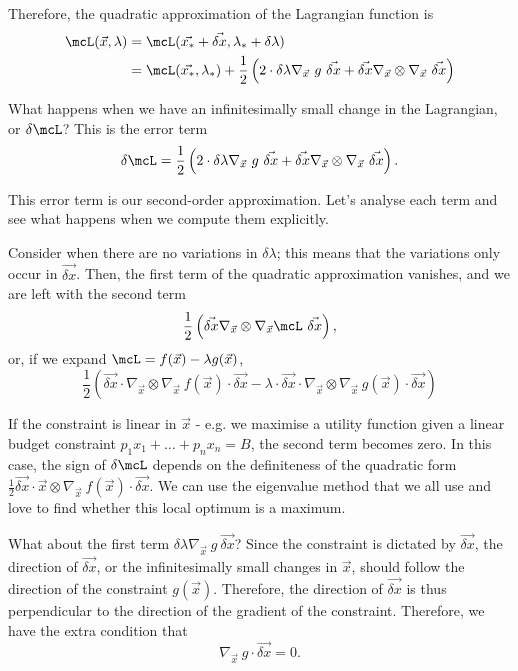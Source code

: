 \documentclass[a4paper, 12pt,oneside,openany]{book}
\begin{document}
Therefore, the quadratic approximation of the Lagrangian function is \begin{align*} \mcL(\vec{x}, \lambda) &= \mcL(\vec{x_*} + \vec{\delta x}, \lambda_* + \delta\lambda) \\ &= \mcL(\vec{x_*}, \lambda_*) + \frac{1}{2} \left(2\cdot  \delta \lambda \nabla_{\vec{x}}\ g\ \vec{\delta x} +\vec{\delta x} \nabla_{\vec{x}} \otimes \nabla_{\vec{x}}\ \vec{\delta x} \right) \end{align*}

What happens when we have an infinitesimally small change in the Lagrangian, or $\delta \mcL$? This is the error term $$\delta \mcL = \frac{1}{2} \left(2\cdot  \delta \lambda \nabla_{\vec{x}}\ g\ \vec{\delta x} +\vec{\delta x} \nabla_{\vec{x}} \otimes \nabla_{\vec{x}}\ \vec{\delta x} \right).$$

This error term is our second-order approximation. Let's analyse each term and see what happens when we compute them explicitly. 

Consider when there are no variations in $\delta\lambda$; this means that the variations only occur in $\vec{\delta x}$. Then, the first term of the quadratic approximation vanishes, and we are left with the second term $$\frac{1}{2} \left( \vec{\delta x} \nabla_{\vec{x}} \otimes \nabla_{\vec{x}}\mcL \ \vec{\delta x} \right),$$ or, if we expand $\mcL = f(\vec{x}) - \lambda g(\vec{x})$, $$\frac{1}{2} \left(\vec{\delta x} \cdot \nabla_{\vec{x}} \otimes \nabla_{\vec{x}}\ f(\vec{x}) \cdot \vec{\delta x} -\lambda \cdot \vec{\delta x} \cdot \nabla_{\vec{x}} \otimes \nabla_{\vec{x}}\ g(\vec{x}) \cdot \vec{\delta x} \right)$$

If the constraint is linear in $\vec{x}$ - e.g. we maximise a utility function given a linear budget constraint $p_1x_1 + \dots + p_nx_n = B$, the second term becomes zero. In this case, the sign of $\delta \mcL$ depends on the definiteness of the quadratic form $\frac{1}{2} \vec{\delta x} \cdot \vec{x} \otimes \nabla_{\vec{x}}\ f(\vec{x}) \cdot \vec{\delta x}$. We can use the eigenvalue method that we all use and love to find whether this local optimum is a maximum.

What about the first term $\delta \lambda \nabla_{\vec{x}}\ g\ \vec{\delta x}$? Since the constraint is dictated by $\vec{\delta x}$, the direction of $\vec{\delta x}$, or the infinitesimally small changes in $\vec{x}$, should follow the direction of the constraint $g(\vec{x})$. Therefore, the direction of $\vec{\delta x}$ is thus perpendicular to the direction of the gradient of the constraint. Therefore, we have the extra condition that $$ \nabla_{\vec{x}}\ g \cdot \vec{\delta x}=0.$$
\end{document}
